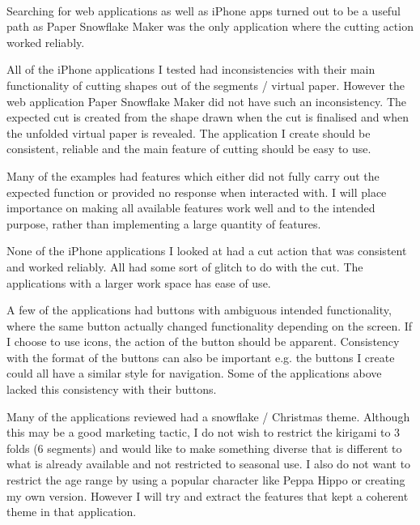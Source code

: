 \documentclass[11pt]{article}
\begin{document}
            \paragraph{}
            Searching for web applications as well as iPhone apps turned out to be a useful path as Paper Snowflake Maker was the only application where the cutting action worked reliably.
            
            All of the iPhone applications I tested had inconsistencies with their main functionality of cutting shapes out of the segments / virtual paper. However the web application Paper Snowflake Maker did not have such an inconsistency. The expected cut is created from the shape drawn when the cut is finalised and when the unfolded virtual paper is revealed. The application I create should be consistent, reliable and the main feature of cutting should be easy to use.  
            
            Many of the examples had features which either did not fully carry out the expected function or provided no response when interacted with. I will place importance on making all available features work well and to the intended purpose, rather than implementing a large quantity of features. 
            
            None of the iPhone applications I looked at had a cut action that was consistent and worked reliably. All had some sort of glitch to do with the cut. The applications with a larger work space has ease of use. 
            
            A few of the applications had buttons with ambiguous intended functionality, where the same button actually changed functionality depending on the screen. If I choose to use icons, the action of the button should be apparent. Consistency with the format of the buttons can also be important e.g. the buttons I create could all have a similar style for navigation. Some of the applications above lacked this consistency with their buttons. 
            
            Many of the applications reviewed had a snowflake / Christmas theme. Although this may be a good marketing tactic, I do not wish to restrict the kirigami to 3 folds (6 segments) and would like to make something diverse that is different to what is already available and not restricted to seasonal use. I also do not want to restrict the age range by using a popular character like Peppa Hippo or creating my own version. However I will try and extract the features that kept a coherent theme in that application.
            
\end{document}
